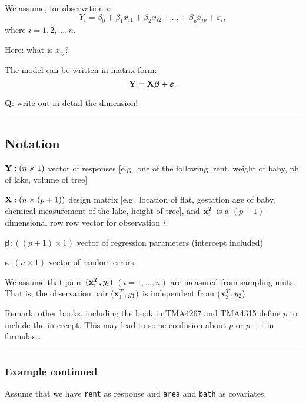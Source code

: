 \documentclass[]{article}
\begin{document}
We assume, for observation \(i\):
\[Y_i= \beta_0 + \beta_{1}  x_{i1} + \beta_2 x_{i2} + ... + \beta_p x_{ip} + \varepsilon_i,\]
where \(i=1,2,...,n\).

Here: what is \(x_{ij}\)?

The model can be written in matrix form:
\[{\bf Y}={\bf X} \boldsymbol{\beta}+{\boldsymbol{\varepsilon}}.\]

\textbf{Q}: write out in detail the dimension!

\begin{center}\rule{0.5\linewidth}{\linethickness}\end{center}

\hypertarget{notation}{%
\subsection{Notation}\label{notation}}

\({\bf Y}: (n \times 1)\) vector of responses {[}e.g.~one of the
following: rent, weight of baby, ph of lake, volume of tree{]}

\({\bf X}: (n \times (p+1))\) design matrix {[}e.g.~location of flat,
gestation age of baby, chemical measurement of the lake, height of
tree{]}, and \({\bf x}_i^T\) is a \((p+1)\)-dimensional row row vector
for observation \(i\).

\({\boldsymbol \beta}: ((p+1) \times 1)\) vector of regression
parameters (intercept included)

\({\boldsymbol \varepsilon}: (n\times 1)\) vector of random errors.

We assume that pairs \(({\bf x}_i^T,y_i)\) \((i=1,...,n)\) are measured
from sampling units. That is, the observation pair \(({\bf x}_1^T,y_1)\)
is independent from \(({\bf x}_2^T,y_2)\).

Remark: other books, including the book in TMA4267 and TMA4315 define
\(p\) to include the intercept. This may lead to some confusion about
\(p\) or \(p+1\) in formulas\ldots{}

\begin{center}\rule{0.5\linewidth}{\linethickness}\end{center}

\hypertarget{example-continued-2}{%
\subsubsection{Example continued}\label{example-continued-2}}

Assume that we have \texttt{rent} as response and \texttt{area} and
\texttt{bath} as covariates.
\end{document}
